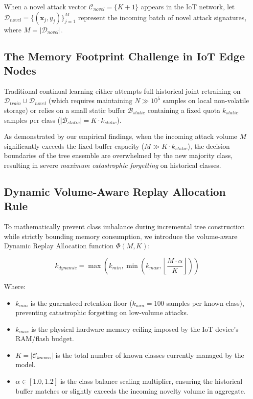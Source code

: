 When a novel attack vector $\mathcal{C}_{novel} = \{K+1\}$ appears in the IoT network, let $\mathcal{D}_{novel} = \{(\mathbf{x}_j, y_j)\}_{j=1}^{M}$ represent the incoming batch of novel attack signatures, where $M = |\mathcal{D}_{novel}|$.

\subsection{The Memory Footprint Challenge in IoT Edge Nodes}
Traditional continual learning either attempts full historical joint retraining on $\mathcal{D}_{train} \cup \mathcal{D}_{novel}$ (which requires maintaining $N \gg 10^5$ samples on local non-volatile storage) or relies on a small static buffer $\mathcal{B}_{static}$ containing a fixed quota $k_{static}$ samples per class ($|\mathcal{B}_{static}| = K \cdot k_{static}$). 

As demonstrated by our empirical findings, when the incoming attack volume $M$ significantly exceeds the fixed buffer capacity ($M \gg K \cdot k_{static}$), the decision boundaries of the tree ensemble are overwhelmed by the new majority class, resulting in severe \textit{maximum catastrophic forgetting} on historical classes.

\subsection{Dynamic Volume-Aware Replay Allocation Rule}
To mathematically prevent class imbalance during incremental tree construction while strictly bounding memory consumption, we introduce the volume-aware Dynamic Replay Allocation function $\Phi(M, K)$:

\begin{equation}
k_{dynamic} = \max\left( k_{min}, \min\left( k_{max}, \left\lfloor \frac{M \cdot \alpha}{K} \right\rfloor \right) \right)
\label{eq:dynamic_rule}
\end{equation}

Where:
\begin{itemize}
    \item $k_{min}$ is the guaranteed retention floor ($k_{min} = 100$ samples per known class), preventing catastrophic forgetting on low-volume attacks.
    \item $k_{max}$ is the physical hardware memory ceiling imposed by the IoT device's RAM/flash budget.
    \item $K = |\mathcal{C}_{known}|$ is the total number of known classes currently managed by the model.
    \item $\alpha \in [1.0, 1.2]$ is the class balance scaling multiplier, ensuring the historical buffer matches or slightly exceeds the incoming novelty volume in aggregate.
\end{itemize}

